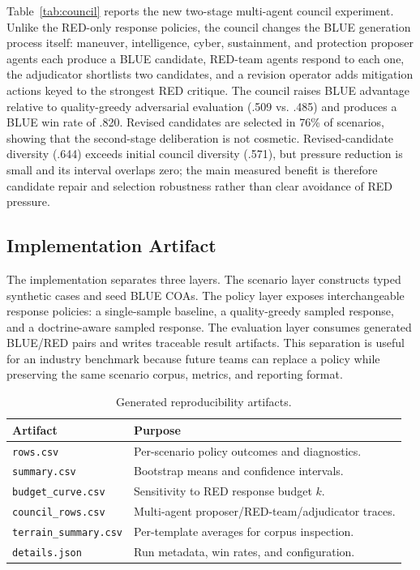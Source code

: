 \documentclass[sigconf]{acmart}
\begin{document}
Table~\ref{tab:council} reports the new two-stage multi-agent council experiment. Unlike the RED-only response policies, the council changes the BLUE generation process itself: maneuver, intelligence, cyber, sustainment, and protection proposer agents each produce a BLUE candidate, RED-team agents respond to each one, the adjudicator shortlists two candidates, and a revision operator adds mitigation actions keyed to the strongest RED critique. The council raises BLUE advantage relative to quality-greedy adversarial evaluation (.509 vs. .485) and produces a BLUE win rate of .820. Revised candidates are selected in 76\% of scenarios, showing that the second-stage deliberation is not cosmetic. Revised-candidate diversity (.644) exceeds initial council diversity (.571), but pressure reduction is small and its interval overlaps zero; the main measured benefit is therefore candidate repair and selection robustness rather than clear avoidance of RED pressure.

\subsection{Implementation Artifact}

The implementation separates three layers. The scenario layer constructs typed synthetic cases and seed BLUE COAs. The policy layer exposes interchangeable response policies: a single-sample baseline, a quality-greedy sampled response, and a doctrine-aware sampled response. The evaluation layer consumes generated BLUE/RED pairs and writes traceable result artifacts. This separation is useful for an industry benchmark because future teams can replace a policy while preserving the same scenario corpus, metrics, and reporting format.

\begin{table}[t]
\caption{Generated reproducibility artifacts.}
\label{tab:artifacts}
\small
\begin{tabular}{lp{.58\linewidth}}
\toprule
Artifact & Purpose \\
\midrule
\texttt{rows.csv} & Per-scenario policy outcomes and diagnostics. \\
\texttt{summary.csv} & Bootstrap means and confidence intervals. \\
\texttt{budget\_curve.csv} & Sensitivity to RED response budget $k$. \\
\texttt{council\_rows.csv} & Multi-agent proposer/RED-team/adjudicator traces. \\
\texttt{terrain\_summary.csv} & Per-template averages for corpus inspection. \\
\texttt{details.json} & Run metadata, win rates, and configuration. \\
\bottomrule
\end{tabular}
\end{table}
\end{document}
